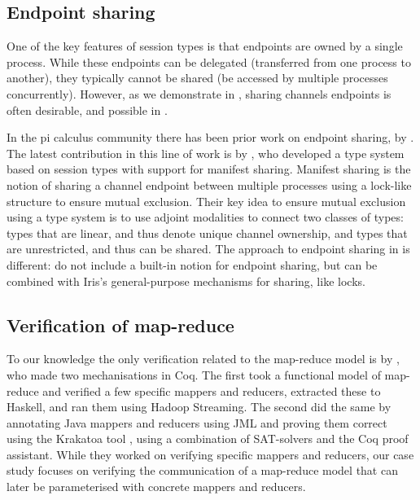 \subsection{Endpoint sharing}
\label{sec:related_manifest_sharing}

One of the key features of session types is that endpoints are owned
by a single process.
While these endpoints can be delegated (\ie transferred from one process to
another), they typically cannot be shared (\ie be accessed by multiple processes
concurrently).
However, as we demonstrate in , sharing channels
endpoints is often desirable, and possible in \lname.

In the pi calculus community there has been prior work
on endpoint sharing, \eg by \citet{atkey2016, kobayashi-CONCUR2016, padovani-CSL2014}.
The latest contribution in this line of work is by
\citet{balzer-PACMPL2017,balzer-ESOP2019}, who
developed a type system based on session types with
support for manifest sharing.
Manifest sharing is the notion of sharing a channel endpoint
between multiple processes using a lock-like structure to ensure mutual
exclusion.
Their key idea to ensure mutual exclusion using a type system is to use
adjoint modalities to connect two classes of types: types
that are linear, and thus denote unique channel ownership, and types that are
unrestricted, and thus can be shared.
The approach to endpoint sharing in \lname is different:
\pname do not include a built-in notion for endpoint sharing, but can be combined
with Iris's general-purpose mechanisms for sharing, like locks.

\subsection{Verification of map-reduce}
\label{sec:related_map_reduce}

To our knowledge the only verification related to the map-reduce model
\cite{dean-OSDI2004} is by
\citet{ono-SEFM2011}, who made two mechanisations in Coq. The first took
a functional model of map-reduce and verified a few specific mappers
and reducers, extracted these to Haskell, and ran them using Hadoop
Streaming. The second did the same by annotating Java mappers and
reducers using JML
and proving them correct using the Krakatoa tool \cite{marche-JLAP2004}, using
a combination of
SAT-solvers and the Coq proof assistant. While they worked on
verifying specific mappers and reducers, our case study focuses on
verifying the communication of a map-reduce model that can later be parameterised with
concrete mappers and reducers.
